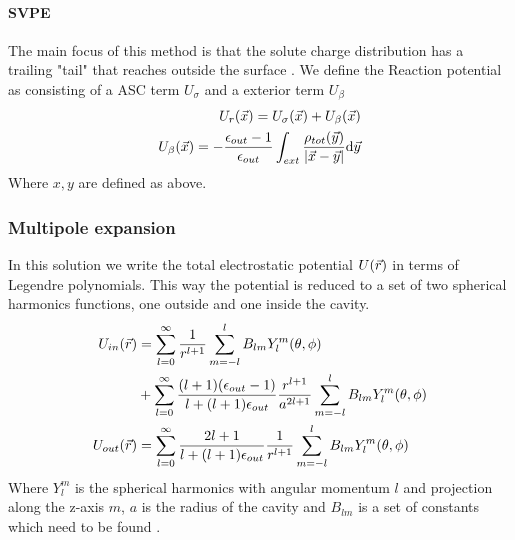\documentclass[../master_thesis.tex]{subfiles}
\begin{document}
\paragraph{\ac{SVPE}}
The main focus of this method is that the solute charge distribution has a trailing
"tail" that reaches outside the surface \cite{Tomasi:2005ipa}. We define the
Reaction potential as consisting of a \ac{ASC} term $U_{\sigma}$ and a exterior
term $U_{\beta}$
\begin{align}
  \begin{split}
    U_r(\vec{x}) = U_{\sigma}(\vec{x}) + U_{\beta}(\vec{x})\\
    U_{\beta}(\vec{x}) = -\frac{\epsilon_{out} - 1}{\epsilon_{out}}\int_{ext} \frac{\rho_{tot}(\vec{y})}{\abs{\vec{x} - \vec{y}}} \text{d}\vec{y}
  \end{split}
\end{align}
Where $x, y$ are defined as above.

\subsubsection{Multipole expansion}
In this solution we write the total electrostatic potential $U(\vec{r})$ in terms
of Legendre polynomials. This way the potential is reduced to a set of two
spherical harmonics functions, one outside and one inside the cavity.
\begin{align}
  \begin{split}
    U_{in}(\vec{r}) &= \sum_{l=0}^{\infty}\frac{1}{r^{l+1}}\sum^l_{m=-l}B_{lm}Y^m_l(\theta, \phi) \\
    &+ \sum_{l=0}^{\infty}\frac{(l+1)(\epsilon_{out} - 1)}{l + (l+1)\epsilon_{out}} \frac{r^{l+1}}{a^{2l+1}}\sum^l_{m=-l}B_{lm}Y^m_l(\theta, \phi)\\
    U_{out}(\vec{r}) &=\sum_{l=0}^{\infty}\frac{2l+1}{l+(l+1)\epsilon_{out}}\frac{1}{r^{l+1}}\sum^l_{m=-l}B_{lm}Y^m_l(\theta, \phi)
  \end{split}
\end{align}
Where $Y^m_l$ is the spherical harmonics with angular momentum $l$ and projection
along the z-axis $m$, $a$ is the radius of the cavity and $B_{lm}$ is a set of
constants which need to be found \cite{Tomasi:1994wt}.
\end{document}
